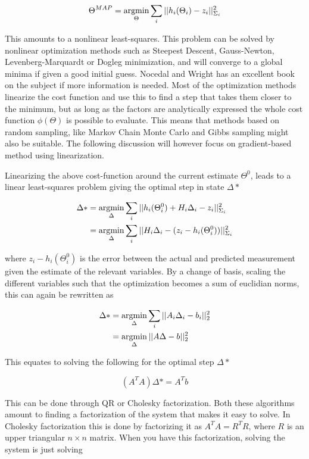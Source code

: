 \begin{equation}
    \Theta^{MAP} = \operatorname*{argmin}_{\Theta}\sum_i ||h_i(\Theta_i) - z_i||_{\Sigma_i}^2
\end{equation}

This amounts to a nonlinear least-squares. This problem can be solved by nonlinear optimization methods such as Steepest Descent, Gauss-Newton, Levenberg-Marquardt or Dogleg minimization, and will converge to a global minima if given a good initial guess. Nocedal and Wright\cite{NumOpt} has an excellent book on the subject if more information is needed. Most of the optimization methods linearize the cost function and use this to find a step that takes them closer to the minimum, but as long as the factors are analytically expressed the whole cost function $\phi(\Theta)$ is possible to evaluate. This means that methods based on random sampling, like Markov Chain Monte Carlo and Gibbs sampling\cite{SamplingOpt} might also be suitable. The following discussion will however focus on gradient-based method using linearization.

Linearizing the above cost-function around the current estimate $\Theta^0$, leads to a linear least-squares problem giving the optimal step in state $\Delta*$

\begin{align}
    \Delta* &= \operatorname*{argmin}_{\Delta}\sum_i ||h_i(\Theta_i^0) + H_i\Delta_i - z_i||_{\Sigma_i}^2 \\ 
    &= \operatorname*{argmin}_{\Delta}\sum_i || H_i\Delta_i - (z_i - h_i(\Theta_i^0))||_{\Sigma_i}^2
\end{align}

where $z_i - h_i(\Theta_i^0)$ is the error between the actual and predicted measurement given the estimate of the relevant variables. By a change of basis, scaling the different variables such that the optimization becomes a sum of euclidian norms, this can again be rewritten as 

\begin{align}
    \Delta* &= \operatorname*{argmin}_{\Delta}\sum_i||A_i\Delta_i - b_i||_2^2 \\
    &= \operatorname*{argmin}_{\Delta}||A\Delta - b||_2^2
\end{align}

This equates to solving the following for the optimal step $\Delta*$

\begin{equation}
    (A^TA)\Delta* = A^Tb
\end{equation}

This can be done through QR or Cholesky factorization. Both these algorithms amount to finding a factorization of the system that makes it easy to solve. In Cholesky factorization this is done by factorizing it as $A^TA = R^TR$, where $R$ is an upper triangular $n \times n$ matrix. When you have this factorization, solving the system is just solving 

